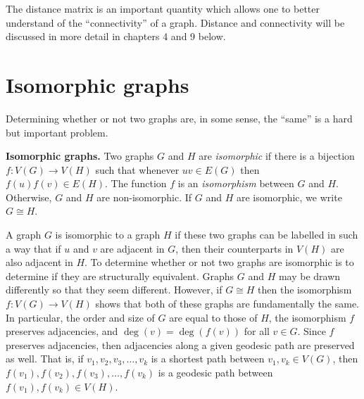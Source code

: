 The distance matrix is an important quantity which allows one
to better understand of the ``connectivity'' of a graph.
Distance and connectivity will be 
discussed in more detail in chapters 4 and 9 below.


\section{Isomorphic graphs}

Determining whether or not two graphs are, in some sense, the ``same''
is a hard but important problem.

\begin{definition}
\textbf{Isomorphic graphs.}
Two graphs $G$ and $H$ are \emph{isomorphic} if there is a bijection
$f: V(G) \longrightarrow V(H)$ such that whenever $uv \in E(G)$ then
$f(u) f(v) \in E(H)$. The function $f$ is an \emph{isomorphism}
between $G$ and $H$. Otherwise, $G$ and $H$ are non-isomorphic. If
$G$ and $H$ are isomorphic, we write $G \cong H$.
\end{definition}

A graph $G$ is isomorphic to a graph $H$ if these two graphs can be
labelled in such a way that if $u$ and $v$ are adjacent in $G$, then
their counterparts in $V(H)$ are also adjacent in $H$. To determine
whether or not two graphs are isomorphic is to determine if they are
structurally equivalent. Graphs $G$ and $H$ may be drawn differently
so that they seem different. However, if $G \cong H$ then the
isomorphism $f: V(G) \longrightarrow V(H)$ shows that both of these
graphs are fundamentally the same. In particular, the order and size
of $G$ are equal to those of $H$, the isomorphism $f$ preserves
adjacencies, and $\deg(v) = \deg(f(v))$ for all $v \in G$. Since $f$
preserves adjacencies, then adjacencies along a given geodesic path
are preserved as well. That is, if $v_1, v_2, v_3, \dots, v_k$ is a
shortest path between $v_1, v_k \in V(G)$, then
$f(v_1), f(v_2), f(v_3), \dots, f(v_k)$ is a geodesic path between
$f(v_1), f(v_k) \in V(H)$.


